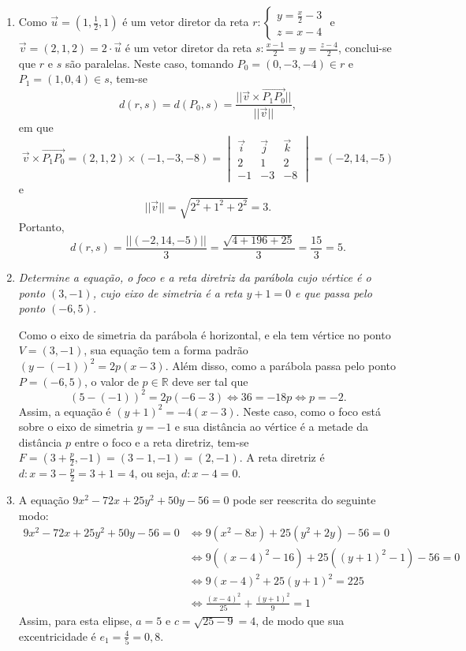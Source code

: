 \documentclass[12pt,a4paper]{article}
\newcommand{\vect}[1]{\overrightarrow{#1}}
\begin{document}
\begin{enumerate}
\item Como $\vec{u}=(1,\frac{1}{2},1)$ é um vetor diretor da reta $r: \begin{cases}
y = \frac{x}{2} - 3\\
z= x - 4
\end{cases}$ e $\vec{v}=(2,1,2) = 2 \cdot \vec{u}$ é um vetor diretor da reta $s: \frac{x-1}{2} = y = \frac{z-4}{2}$, conclui-se que $r$ e $s$ são paralelas. Neste caso, tomando $P_0 = (0, -3, -4) \in r$ e $P_1 = (1, 0, 4) \in s$, tem-se
\[
d(r,s)
= d(P_0,s)
= \frac{|| \vec{v} \times \vect{P_1 P_0} ||}{|| \vec{v} ||},
\]
em que
\[
\vec{v} \times \vect{P_1 P_0}
=(2,1,2) \times (-1,-3,-8)
=\begin{vmatrix}
\vec{i} & \vec{j} & \vec{k}\\
 2 &  1 &  2\\
-1 & -3 & -8
\end{vmatrix}
= (-2, 14, -5)
\]
e
\[
|| \vec{v} || = \sqrt{2^2+1^2+2^2} = 3.
\]
Portanto,
\[
d(r,s)
= \frac{|| (-2, 14, -5) || }{3}
= \frac{\sqrt{4+196+25} }{3}
= \frac{15}{3}
= 5.
\]

\item \textit{Determine a equação, o foco e a reta diretriz da parábola cujo vértice é o ponto $(3,-1)$, cujo eixo de simetria é a reta $y+1=0$ e que passa pelo ponto $(-6,5)$.}

Como o eixo de simetria da parábola é horizontal, e ela tem vértice no ponto $V = (3,-1)$, sua equação tem a forma padrão $(y-(-1))^2 = 2p(x-3)$. Além disso, como a parábola passa pelo ponto $P=(-6,5)$, o valor de $p \in \mathbb{R}$ deve ser tal que
\[
(5-(-1))^2 = 2p(-6-3)
\Leftrightarrow
36 = -18p
\Leftrightarrow
p = -2.
\]
Assim, a equação é $(y+1)^2 = -4(x-3)$. Neste caso, como o foco está sobre o eixo de simetria $y=-1$ e sua distância ao vértice é a metade da distância $p$ entre o foco e a reta diretriz, tem-se $F=(3+\frac{p}{2},-1) = (3-1,-1) = (2,-1)$. A reta diretriz é $d: x = 3-\frac{p}{2} = 3 + 1 = 4$, ou seja, $d: x-4 = 0$.

\item A equação $9 x^2-72 x+25 y^2+50 y-56 = 0$ pode ser reescrita do seguinte modo:
\begin{align*}
9 x^2-72 x+25 y^2+50 y-56 = 0
& \Leftrightarrow
9 (x^2 - 8x) + 25(y^2 +2y) - 56 = 0\\
& \Leftrightarrow
9 ((x-4)^2 - 16) + 25((y+1)^2 -1) - 56 = 0\\
& \Leftrightarrow
9(x-4)^2 + 25(y+1)^2 = 225\\
& \Leftrightarrow
\frac{(x-4)^2}{25} + \frac{(y+1)^2}{9} = 1
\end{align*}
Assim, para esta elipse, $a=5$ e $c=\sqrt{25-9}=4$, de modo que sua excentricidade é $e_1 = \frac{4}{5} = 0,8$.


\end{enumerate}
\end{document}
